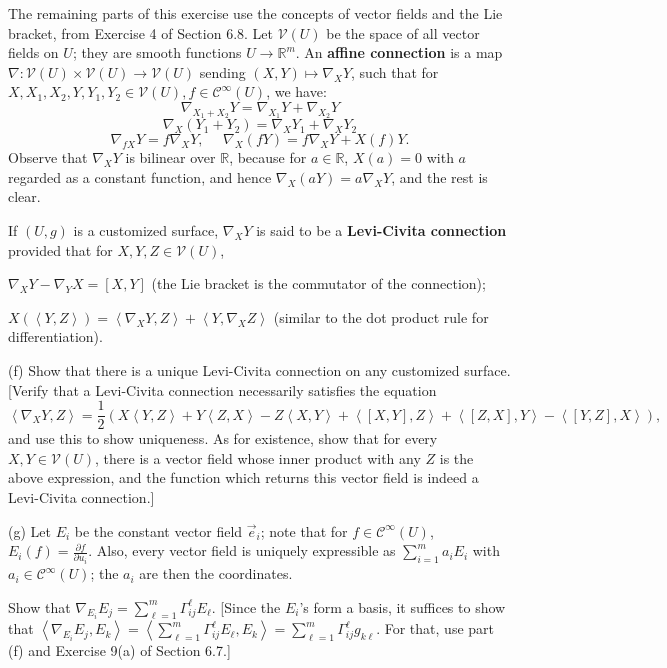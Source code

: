 \documentclass[leqno]{book}
\begin{document}
\begin{enumerate}

The remaining parts of this exercise use the concepts of vector fields and the Lie bracket, from Exercise 4 of Section 6.8.  Let $\mathcal V(U)$ be the space of all vector fields on $U$; they are smooth functions $U\to\mathbb R^m$.  An \textbf{affine connection} is a map $\nabla:\mathcal V(U)\times\mathcal V(U)\to\mathcal V(U)$ sending $(X,Y)\mapsto\nabla_XY$, such that for $X,X_1,X_2,Y,Y_1,Y_2\in\mathcal V(U),f\in\mathcal C^\infty(U)$, we have:
$$\nabla_{X_1+X_2}Y=\nabla_{X_1}Y+\nabla_{X_2}Y$$
$$\nabla_X(Y_1+Y_2)=\nabla_XY_1+\nabla_XY_2$$
$$\nabla_{fX}Y=f\nabla_XY,~~~~~~\nabla_X(fY)=f\nabla_XY+X(f)Y.$$
Observe that $\nabla_XY$ is bilinear over $\mathbb R$, because for $a\in\mathbb R$, $X(a)=0$ with $a$ regarded as a constant function, and hence $\nabla_X(aY)=a\nabla_XY$, and the rest is clear.

If $(U,g)$ is a customized surface, $\nabla_XY$ is said to be a \textbf{Levi-Civita connection} provided that for $X,Y,Z\in\mathcal V(U)$,
\begin{center}
$\nabla_XY-\nabla_YX=[X,Y]$ (the Lie bracket is the commutator of the connection);

$X(\left<Y,Z\right>)=\left<\nabla_XY,Z\right>+\left<Y,\nabla_XZ\right>$ (similar to the dot product rule for differentiation).
\end{center}
(f) Show that there is a unique Levi-Civita connection on any customized surface.  [Verify that a Levi-Civita connection necessarily satisfies the equation
$$\left<\nabla_XY,Z\right>=\frac 12\left(X\left<Y,Z\right>+Y\left<Z,X\right>-Z\left<X,Y\right>+\left<[X,Y],Z\right>+\left<[Z,X],Y\right>-\left<[Y,Z],X\right>\right),$$
and use this to show uniqueness.  As for existence, show that for every $X,Y\in\mathcal V(U)$, there is a vector field whose inner product with any $Z$ is the above expression, and the function which returns this vector field is indeed a Levi-Civita connection.]

(g) Let $E_i$ be the constant vector field $\vec e_i$; note that for $f\in\mathcal C^\infty(U)$, $E_i(f)=\frac{\partial f}{\partial u_i}$.  Also, every vector field is uniquely expressible as $\sum_{i=1}^m a_iE_i$ with $a_i\in\mathcal C^\infty(U)$; the $a_i$ are then the coordinates.

Show that $\nabla_{E_i}E_j=\sum_{\ell=1}^m\Gamma_{ij}^\ell E_\ell$.  [Since the $E_i$'s form a basis, it suffices to show that $\left<\nabla_{E_i}E_j,E_k\right>=\left<\sum_{\ell=1}^m\Gamma_{ij}^\ell E_\ell,E_k\right>=\sum_{\ell=1}^m\Gamma_{ij}^\ell g_{k\ell}$.  For that, use part (f) and Exercise 9(a) of Section 6.7.]


\end{enumerate}
\end{document}
